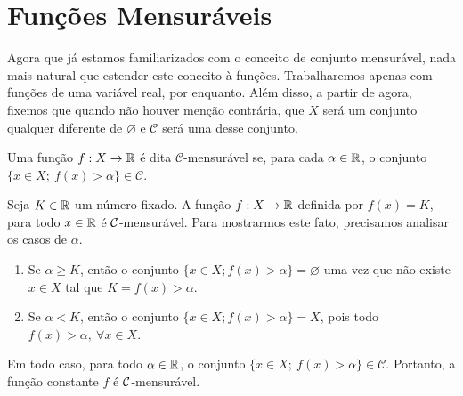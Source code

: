\section{Funções Mensuráveis}


Agora que já estamos familiarizados com o conceito de conjunto mensurável, nada mais natural que estender este conceito à funções. Trabalharemos apenas com funções de uma variável real, por enquanto.
Além disso, a partir de agora, fixemos que quando não houver menção contrária,  que $X$ será um conjunto qualquer diferente de $\varnothing$ e $\mathcal{C}$ será uma \sigal desse conjunto. 

\begin{definition}
	\label{def:mensurabilidade-funções-reais}
    Uma função $f: X \to \mathbb{R} $ é dita $\mathcal{C}$-mensurável se, para cada $\alpha \in \mathbb{R}$, o conjunto $\{x \in X;\ f(x) > \alpha\} \in \mathcal{C}$.
\end{definition}


\begin{example}
\label{ex:funcao-constante}
	Seja $K \in \mathbb{R}$ um número fixado. 
	A função $f: X \to \mathbb{R}$ definida por $f(x) = K$, para todo $x \in \mathbb{R}$  é $\operatorname{\mathcal{C}}$-mensurável.
	Para mostrarmos este fato, precisamos analisar os casos de $\alpha$.
	\begin{enumerate}[label*= (\Roman*)]
	\item Se $\alpha \geq K$, então o conjunto $\{x \in X; f(x) > \alpha\} = \varnothing$ uma vez que não existe $x \in X$ tal que $K = f(x) > \alpha$.
	\item Se $\alpha < K$, então  o conjunto $\{x \in X; f(x) > \alpha\} = X$, pois todo $f(x) > \alpha,\ \forall x \in X$.
	\end{enumerate}
	Em todo caso, para todo $\alpha \in \mathbb{R}$, o conjunto  $\{x \in X;\ f(x) > \alpha\} \in \mathcal{C}$.
	Portanto, a função constante $f$ é $\operatorname{\mathcal{C}}$-mensurável.
\end{example}

